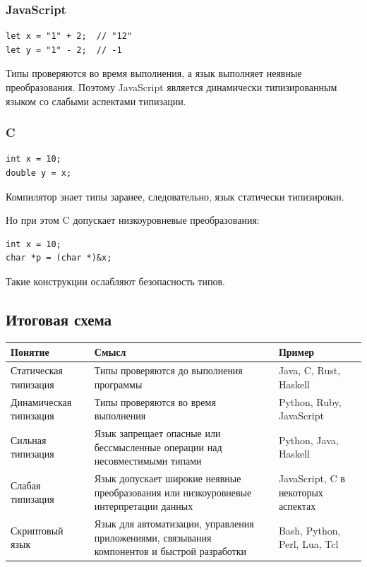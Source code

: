 \documentclass[12pt,a4paper]{article}
\begin{document}
\subsubsection{JavaScript}

\begin{verbatim}
let x = "1" + 2;  // "12"
let y = "1" - 2;  // -1
\end{verbatim}

Типы проверяются во время выполнения, а язык выполняет неявные преобразования.
Поэтому JavaScript является динамически типизированным языком со слабыми аспектами
типизации.

\subsubsection{C}

\begin{verbatim}
int x = 10;
double y = x;
\end{verbatim}

Компилятор знает типы заранее, следовательно, язык статически типизирован.

Но при этом C допускает низкоуровневые преобразования:

\begin{verbatim}
int x = 10;
char *p = (char *)&x;
\end{verbatim}

Такие конструкции ослабляют безопасность типов.

\subsection{Итоговая схема}

\begin{center}
\begin{tabular}{|p{}|p{}|p{}|}
\hline
\textbf{Понятие} & \textbf{Смысл} & \textbf{Пример} \\
\hline
Статическая типизация &
Типы проверяются до выполнения программы &
Java, C, Rust, Haskell \\
\hline
Динамическая типизация &
Типы проверяются во время выполнения &
Python, Ruby, JavaScript \\
\hline
Сильная типизация &
Язык запрещает опасные или бессмысленные операции над несовместимыми типами &
Python, Java, Haskell \\
\hline
Слабая типизация &
Язык допускает широкие неявные преобразования или низкоуровневые интерпретации данных &
JavaScript, C в некоторых аспектах \\
\hline
Скриптовый язык &
Язык для автоматизации, управления приложениями, связывания компонентов и быстрой разработки &
Bash, Python, Perl, Lua, Tcl \\
\hline
\end{tabular}
\end{center}
\end{document}
